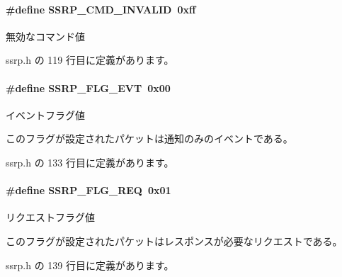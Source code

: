 \paragraph[{S\+S\+R\+P\+\_\+\+C\+M\+D\+\_\+\+I\+N\+V\+A\+L\+I\+D}]{\setlength{\rightskip}{0pt plus 5cm}\#define S\+S\+R\+P\+\_\+\+C\+M\+D\+\_\+\+I\+N\+V\+A\+L\+I\+D~0xff}\label{ssrp_8h_ae0034a89b11e015781cdddd1c8ac788e_ae0034a89b11e015781cdddd1c8ac788e}


無効なコマンド値 



 ssrp.\+h の 119 行目に定義があります。

\paragraph[{S\+S\+R\+P\+\_\+\+F\+L\+G\+\_\+\+E\+V\+T}]{\setlength{\rightskip}{0pt plus 5cm}\#define S\+S\+R\+P\+\_\+\+F\+L\+G\+\_\+\+E\+V\+T~0x00}\label{ssrp_8h_a37fa1ba70b1bbcc342ebfc53a71a9fc5_a37fa1ba70b1bbcc342ebfc53a71a9fc5}


イベントフラグ値 

このフラグが設定されたパケットは通知のみのイベントである。 

 ssrp.\+h の 133 行目に定義があります。

\paragraph[{S\+S\+R\+P\+\_\+\+F\+L\+G\+\_\+\+R\+E\+Q}]{\setlength{\rightskip}{0pt plus 5cm}\#define S\+S\+R\+P\+\_\+\+F\+L\+G\+\_\+\+R\+E\+Q~0x01}\label{ssrp_8h_aee057c24ccb15f205354180ec08aa76c_aee057c24ccb15f205354180ec08aa76c}


リクエストフラグ値 

このフラグが設定されたパケットはレスポンスが必要なリクエストである。 

 ssrp.\+h の 139 行目に定義があります。

